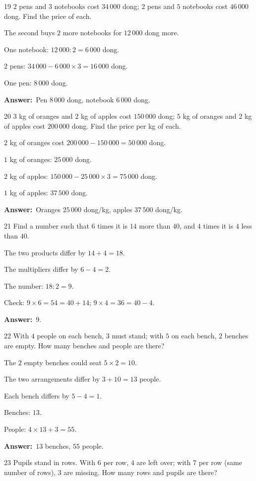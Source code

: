 \documentclass[11pt]{article}
\newif\ifsol \solfalse
\providecommand{\AnsWord}{Đáp số}
\newcommand{\dapso}[1]{\par\textbf{\AnsWord:}\ #1}
\newcommand{\probsol}[1]{%
  \begin{lrbox}{\solmeasure}\begin{minipage}{\dimexpr\linewidth-24pt\relax}#1\end{minipage}\end{lrbox}%
  \ifsol
    \begin{solbox}#1\end{solbox}%
  \else
    \setlength{\solht}{\dimexpr\ht\solmeasure+\dp\solmeasure+0.85cm\relax}%
    \ifdim\solht<1.35cm\setlength{\solht}{1.35cm}\fi
    \begin{tcolorbox}[colback=white,colframe=Line,boxrule=0.8pt,arc=5pt,
      left=8pt,right=8pt,top=4pt,bottom=4pt,height=\solht]{\footnotesize\color{Slate}\itshape\WorkWord}\end{tcolorbox}%
  \fi}
\newcommand{\gap}{\vspace{0.3cm}}
\def\WorkWord{Your work:}
\def\AnsWord{Answer}
\begin{document}
\gap
\begin{probbox}{19}{\relax}
$2$ pens and $3$ notebooks cost $34\,000$ dong; $2$ pens and $5$ notebooks cost $46\,000$ dong. Find the price of each.
\end{probbox}
\probsol{
The second buys $2$ more notebooks for $12\,000$ dong more.\par One notebook: $12\,000:2=6\,000$ dong.\par $2$ pens: $34\,000-6\,000\times3=16\,000$ dong.\par One pen: $8\,000$ dong.
\dapso{Pen $8\,000$ dong, notebook $6\,000$ dong.}}
\gap
\begin{probbox}{20}{\relax}
$3$ kg of oranges and $2$ kg of apples cost $150\,000$ dong; $5$ kg of oranges and $2$ kg of apples cost $200\,000$ dong. Find the price per kg of each.
\end{probbox}
\probsol{
$2$ kg of oranges cost $200\,000-150\,000=50\,000$ dong.\par $1$ kg of oranges: $25\,000$ dong.\par $2$ kg of apples: $150\,000-25\,000\times3=75\,000$ dong.\par $1$ kg of apples: $37\,500$ dong.
\dapso{Oranges $25\,000$ dong/kg, apples $37\,500$ dong/kg.}}
\gap
\begin{probbox}{21}{\relax}
Find a number such that $6$ times it is $14$ more than $40$, and $4$ times it is $4$ less than $40$.
\end{probbox}
\probsol{
The two products differ by $14+4=18$.\par The multipliers differ by $6-4=2$.\par The number: $18:2=9$.\par Check: $9\times6=54=40+14$; $9\times4=36=40-4$.
\dapso{$9$.}}
\gap
\begin{probbox}{22}{\relax}
With $4$ people on each bench, $3$ must stand; with $5$ on each bench, $2$ benches are empty. How many benches and people are there?
\end{probbox}
\probsol{
The $2$ empty benches could seat $5\times2=10$.\par The two arrangements differ by $3+10=13$ people.\par Each bench differs by $5-4=1$.\par Benches: $13$.\par People: $4\times13+3=55$.
\dapso{$13$ benches, $55$ people.}}
\gap
\begin{probbox}{23}{\relax}
Pupils stand in rows. With $6$ per row, $4$ are left over; with $7$ per row (same number of rows), $3$ are missing. How many rows and pupils are there?
\end{probbox}
\end{document}
